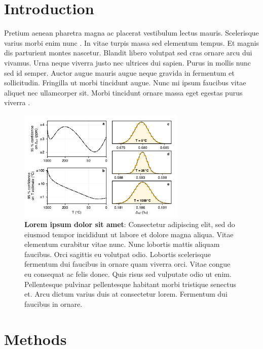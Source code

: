 \hypertarget{introduction}{%
\section{Introduction}\label{introduction}}

Pretium aenean pharetra magna ac placerat vestibulum lectus mauris.
Scelerisque varius morbi enim nunc \cite{Coplen-2007}. In vitae turpis
massa sed elementum tempus. Et magnis dis parturient montes nascetur.
Blandit libero volutpat sed cras ornare arcu dui vivamus. Urna neque
viverra justo nec ultrices dui sapien. Purus in mollis nunc sed id
semper. Auctor augue mauris augue neque gravida in fermentum et
sollicitudin. Fringilla ut morbi tincidunt augue. Nunc mi ipsum faucibus
vitae aliquet nec ullamcorper sit. Morbi tincidunt ornare massa eget
egestas purus viverra .

\begin{figure}[b!]
\center
\includegraphics[width=80mm]{input/qmc}
\caption{
\textbf{Lorem ipsum dolor sit amet}: Consectetur adipiscing elit, sed do
eiusmod tempor incididunt ut labore et dolore magna aliqua. Vitae
elementum curabitur vitae nunc. Nunc lobortis mattis aliquam faucibus.
Orci sagittis eu volutpat odio. Lobortis scelerisque fermentum dui
faucibus in ornare quam viverra orci. Vitae congue eu consequat ac felis
donec. Quis risus sed vulputate odio ut enim. Pellentesque pulvinar
pellentesque habitant morbi tristique senectus et. Arcu dictum varius
duis at consectetur lorem. Fermentum dui faucibus in ornare.
}
\label{fig:qmc}
\end{figure}

\hypertarget{methods}{%
\section{Methods}\label{methods}}

\label{sec:methods}

